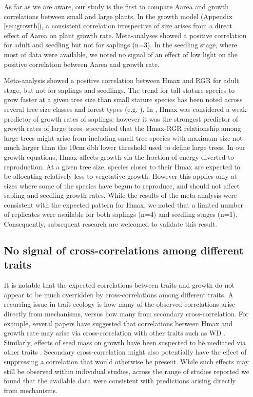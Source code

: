 \documentclass[a4paper,11pt]{article}
\begin{document}
As far as we are aware, our study is the first to compare Aarea and growth correlations between small and large plants. In the growth model (Appendix \ref{sec:growth}), a consistent correlation irrespective of size arises from a direct effect of Aarea on plant growth rate. Meta-analyses showed a positive correlation for adult and seedling but not for saplings (n=3). In the seedling stage, where most of data were available, we noted no signal of an effect of low light on the positive correlation between Aarea and growth rate.

Meta-analysis showed a positive correlation between Hmax and RGR for adult stage, but not for saplings and seedlings. The trend for tall stature species to grow faster at a given tree size than small stature species has been noted across several tree size classes and forest types (e.g. \citealt{Thomas:1996do,Poorter:2008iu,Wright:2010tp,Herault:2011dd,Ruger:2012jv,Iida:2014ep}). In \citet{Wright:2010tp}, Hmax was considered a weak predictor of growth rates of saplings; however it was the strongest predictor of growth rates of large trees. \citet{Poorter:2008iu} speculated that the Hmax-RGR relationship among large trees might arise from including small tree species with maximum size not much larger than the 10cm dbh lower threshold used to define large trees. In our growth equations, Hmax affects growth via the fraction of energy diverted to reproduction. At a given tree size, species closer to their Hmax are expected to be allocating relatively less to vegetative growth. However this applies only at sizes where some of the species have begun to reproduce, and should not affect sapling and seedling growth rates. While the results of the meta-analysis were consistent with the expected pattern for Hmax, we noted that a limited number of replicates were available for both saplings (n=4) and seedling stages (n=1). Consequently, subsequent research are welcomed to validate this result. 


\subsection*{No signal of cross-correlations among different traits}

It is notable that the expected correlations between traits and growth do not appear to be much overridden by cross-correlations among different traits. A recurring issue in trait ecology is how many of the observed correlations arise directly from mechanisms, versus how many from secondary cross-correlation. For example, several papers have suggested that correlations between Hmax and growth rate may arise via cross-correlation with other traits such as WD \citep{Thomas:1996do, Poorter:2006vb, Wright:2010tp}. Similarly, effects of seed mass on growth have been suspected to be mediated via other traits \citep{Shipley:1990js,Westoby:2002ft,Poorter:2006vb}. Secondary cross-correlation might also potentially have the effect of suppressing a correlation that would otherwise be present. While such effects may still be observed within individual studies, across the range of studies reported we found that the available data were consistent with predictions arising directly from mechanisms.
\end{document}
